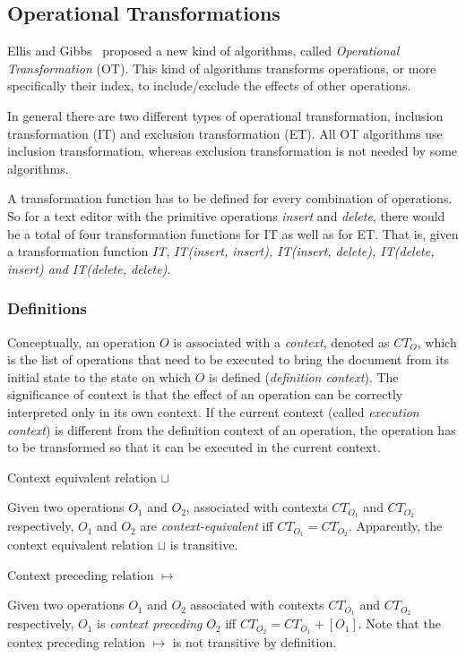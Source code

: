 \documentclass[11pt,a4paper]{article}
\begin{document}
\subsection{Operational Transformations}
{Ellis and Gibbs}~\cite{ellis} proposed a new kind of algorithms, called \emph{Operational Transformation} (OT).  This kind of algorithms transforms operations, or more specifically their index, to include/exclude the effects of other operations.

In general there are two different types of operational transformation, inclusion transformation (IT) and exclusion transformation (ET). All OT algorithms use inclusion transformation, whereas exclusion transformation is not needed by some algorithms.

A transformation function has to be defined for every combination of operations. So for a text editor with the primitive operations \emph{insert} and \emph{delete}, there would be a total of four transformation functions for IT as well as for ET. That is, given a transformation function \emph{IT}, \emph{IT(insert, insert), IT(insert, delete), IT(delete, insert) and IT(delete, delete)}.

\subsubsection{Definitions}
\label{definitions}
Conceptually, an operation $O$ is associated with a \emph{context}, denoted as $CT_{O}$, which is the list of operations that need to be executed to bring the document from its initial state to the state on which $O$ is defined (\emph{definition context}). The significance of context is that the effect of an operation can be correctly interpreted only in its own context. If the current context (called \emph{execution context}) is different from the definition context of an operation, the operation has to be transformed so that it can be executed in the current context.

\begin{defn}
Context equivalent relation $\sqcup$
\end{defn}

Given two operations $O_{1}$ and $O_{2}$, associated with contexts $CT_{O_{1}}$ and $CT_{O_{2}}$ respectively, $O_{1}$ and $O_{2}$ are \emph{context-equivalent} iff $CT_{O_{1}}=CT_{O_{2}}$. Apparently, the context equivalent relation $\sqcup$ is transitive.

\begin{defn}
Context preceding relation $\mapsto$
\end{defn}
Given two operations $O_{1}$ and $O_{2}$ associated with contexts $CT_{O_{1}}$ and $CT_{O_{2}}$ respectively, $O_{1}$ is \emph{context preceding} $O_{2}$ iff $CT_{O_{2}}=CT_{O_{1}} + [O_{1}]$. Note that the contex preceding relation $\mapsto$ is not transitive by definition.
\end{document}
